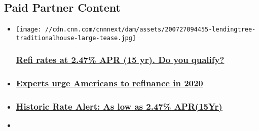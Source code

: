 \hypertarget{paid-partner-content-}{%
\subsection{Paid Partner Content~}\label{paid-partner-content-}}

\begin{itemize}
\item
  \href{https://ck.lendingtree.com/?a=342\&c=2658\&p=r\&s1=moneyother\&mtaid=626CF\&ctype=moneyother\&cmethod=refiform\&rcode=1000\&ccreative=refiratesat24715yrdoyouqualify_traditionalhouse\&placement_name=moneyother\&ad_headline=refiratesat24715yrdoyouqualify\&ad_image_name=traditionalhouse}{}

  \texttt{[image: //cdn.cnn.com/cnnnext/dam/assets/200727094455-lendingtree-traditionalhouse-large-tease.jpg]}

  \hypertarget{refi-rates-at-247-apr-15-yr-do-you-qualify}{%
  \subsubsection{\texorpdfstring{\href{https://ck.lendingtree.com/?a=342\&c=2658\&p=r\&s1=moneyother\&mtaid=626CF\&ctype=moneyother\&cmethod=refiform\&rcode=1000\&ccreative=refiratesat24715yrdoyouqualify_traditionalhouse\&placement_name=moneyother\&ad_headline=refiratesat24715yrdoyouqualify\&ad_image_name=traditionalhouse}{Refi
  rates at 2.47\% APR (15 yr). Do you
  qualify?}}{Refi rates at 2.47\% APR (15 yr). Do you qualify?}}\label{refi-rates-at-247-apr-15-yr-do-you-qualify}}
\item
  \hypertarget{experts-urge-americans-to-refinance-in-2020}{%
  \subsubsection{\texorpdfstring{\href{https://ck.lendingtree.com/?a=342\&c=2658\&p=r\&s1=moneyother\&mtaid=626CF\&ctype=moneyother\&cmethod=refiform\&rcode=1000\&ccreative=expertsurge2_traditionalhouse\&placement_name=moneyother\&ad_headline=expertsurge2\&ad_image_name=traditionalhouse}{Experts
  urge Americans to refinance in
  2020}}{Experts urge Americans to refinance in 2020}}\label{experts-urge-americans-to-refinance-in-2020}}
\item
  \hypertarget{historic-rate-alert-as-low-as-247-apr15yr}{%
  \subsubsection{\texorpdfstring{\href{https://ck.lendingtree.com/?a=342\&c=2658\&p=r\&s1=moneyother\&mtaid=626CF\&ctype=moneyother\&cmethod=refiform\&rcode=1000\&ccreative=historicrateat24715yr_traditionalhouse\&placement_name=moneyother\&ad_headline=historicrateat24715yr\&ad_image_name=traditionalhouse}{Historic
  Rate Alert: As low as 2.47\%
  APR(15Yr)}}{Historic Rate Alert: As low as 2.47\% APR(15Yr)}}\label{historic-rate-alert-as-low-as-247-apr15yr}}
\item
  \hypertarget{hack-your-mortgage-by-refinancing-to-a-15yr-fixed}{%
}
\end{itemize}
